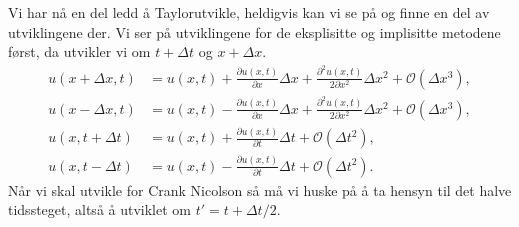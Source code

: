 \documentclass[norsk, 10pt]{article}
\begin{document}
Vi har nå en del ledd å Taylorutvikle, heldigvis kan vi se på \cite{mhj} og finne en del av utviklingene der. Vi ser på utviklingene for de eksplisitte og implisitte metodene først, da utvikler vi om $t+\Delta t$ og $x + \Delta x$.
\begin{align}
u(x+\Delta x,t)&=u(x,t)+\frac{\partial u(x,t)}{\partial x} \Delta x+\frac{\partial^2 u(x,t)}{2\partial x^2}\Delta x^2+\mathcal{O}(\Delta x^3),\label{eq:taydeltaxpluss} \\
u(x-\Delta x,t)&=u(x,t)-\frac{\partial u(x,t)}{\partial x}\Delta x+\frac{\partial^2 u(x,t)}{2\partial x^2} \Delta x^2+\mathcal{O}(\Delta x^3), \label{eq:taydeltaxminus} \\
u(x,t+\Delta t)&=u(x,t)+\frac{\partial u(x,t)}{\partial t}\Delta t+  \mathcal{O}(\Delta t^2), \label{eq:taydeltatpluss} \\
u(x,t-\Delta t)&=u(x,t)-\frac{\partial u(x,t)}{\partial t}\Delta t+  \mathcal{O}(\Delta t^2). \label{eq:taydeltatminus}
\end{align}
Når vi skal utvikle for Crank Nicolson så må vi huske på å ta hensyn til det halve tidssteget, altså å utviklet om $t' = t + \Delta t/2$.
\end{document}
